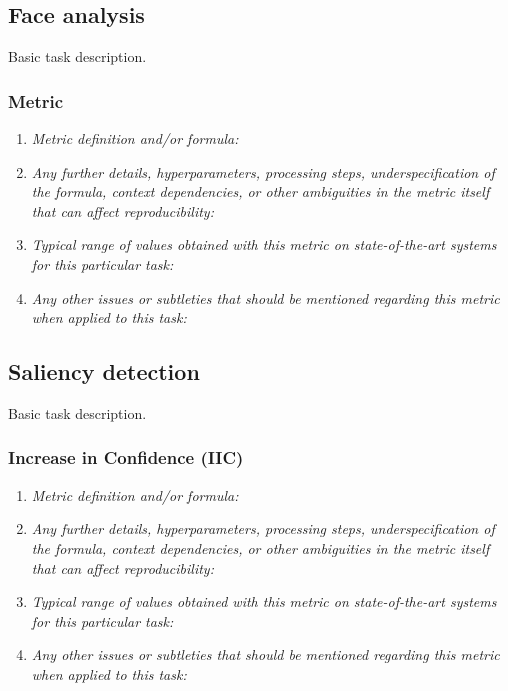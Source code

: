 \documentclass[a4paper,11pt]{article}
\begin{document}
    \subsection{Face analysis} \label{face_analysis}
        Basic task description.
        \subsubsection{Metric}
            \begin{enumerate}[label=\alph*.]
                \item \textit{Metric definition and/or formula:}
                \bigskip
                \item \textit{Any further details, hyperparameters, processing steps, underspecification of the formula, context dependencies, or other ambiguities in the metric itself that can affect reproducibility:}
                \bigskip
                \item \textit{Typical range of values obtained with this metric on state-of-the-art systems for this particular task:}
                \bigskip
                \item \textit{Any other issues or subtleties that should be mentioned regarding this metric when applied to this task:}
                \bigskip
            \end{enumerate}

    \subsection{Saliency detection}
        Basic task description.
        \subsubsection{Increase in Confidence (IIC)}
            \begin{enumerate}[label=\alph*.]
                \item \textit{Metric definition and/or formula:}
                \bigskip
                \item \textit{Any further details, hyperparameters, processing steps, underspecification of the formula, context dependencies, or other ambiguities in the metric itself that can affect reproducibility:}
                \bigskip
                \item \textit{Typical range of values obtained with this metric on state-of-the-art systems for this particular task:}
                \bigskip
                \item \textit{Any other issues or subtleties that should be mentioned regarding this metric when applied to this task:}
                \bigskip
            \end{enumerate}
\end{document}
